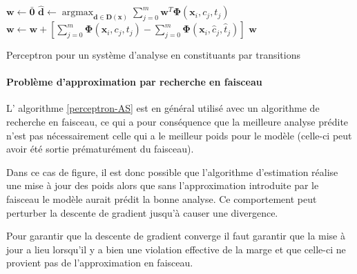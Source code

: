 \documentclass[11pt,openany]{book}
\begin{document}
\begin{algorithm}[htbp]
\begin{algorithmic}[1]
\State $\mathbf{w} \gets \bar{\mathbf{0}}$
\State
$\hat{\mathbf{d}} \gets \mathop{\text{argmax}}_{\mathbf{d}\in
  \mathbf{D}(\mathbf{x})} 
\sum_{j = 0}^m \mathbf{w}^T \boldsymbol\Phi(\mathbf{x}_i,c_j,t_j)$
     \State $\mathbf{w} \gets  \mathbf{w} +
     \left[ \sum_{j=0}^m \boldsymbol\Phi(\mathbf{x}_i,c_j,t_j) 
       - \sum_{j=0}^m \boldsymbol\Phi(\mathbf{x}_i,\hat{c}_j,\hat{t}_j)   \right]$ 
\EndIf
\EndFor
\EndFor
\State \Return $\mathbf{w}$
\EndFunction
\end{algorithmic}
\caption{\label{perceptron-cfg}Perceptron pour un système d'analyse
  en constituants par transitions}
\end{algorithm}


\paragraph{Problème d'approximation par recherche en faisceau}
L' algorithme \ref{perceptron-AS} est en général utilisé avec un
algorithme de recherche en faisceau, ce qui a pour conséquence que la
meilleure analyse prédite n'est pas nécessairement celle qui a le meilleur
poids pour le modèle (celle-ci peut avoir été sortie prématurément du faisceau).

Dans ce cas de figure, il est donc possible que l'algorithme
d'estimation réalise une mise à jour des poids alors que sans
l'approximation introduite par le faisceau
le modèle aurait prédit la bonne analyse. Ce comportement peut
perturber la descente de gradient jusqu'à causer une divergence.

Pour garantir que la descente de gradient converge il faut garantir
que la mise à jour a lieu lorsqu'il y a bien une violation effective de la marge
et que celle-ci ne provient pas de l'approximation en faisceau.
\end{document}
